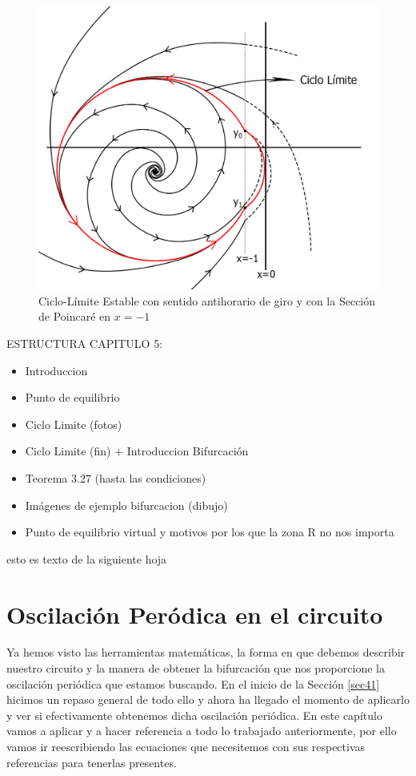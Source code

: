 \documentclass[12pt,a4paper]{report} %
\begin{document}
	\newpage
	
		\begin{figure}[h]
		\centering
		\includegraphics[width=1\textwidth]{ciclolimite3.jpg}
		\caption{Ciclo-Límite Estable con sentido antihorario de giro y con la Sección de Poincaré en $x=-1$}
		\label{fig:ciclolimite3}
	\end{figure}\smallskip
	
	\newpage
	
	ESTRUCTURA CAPITULO 5:
	\begin{itemize}
		\item Introduccion
		\item Punto de equilibrio 
		\item Ciclo Limite (fotos)
		\item Ciclo Limite (fin) + Introduccion Bifurcación
		\item Teorema 3.27 (hasta las condiciones)
		\item Imágenes de ejemplo bifurcacion (dibujo)
		\item Punto de equilibrio virtual y motivos por los que la zona R no nos importa
	\end{itemize}
	
	\newpage
	esto es texto de la siguiente hoja
	
	\chapter{Oscilación Peródica en el circuito}
	
	Ya hemos visto las herramientas matemáticas, la forma en que debemos describir nuestro circuito y la manera de obtener la bifurcación que nos proporcione la oscilación periódica que estamos buscando. En el inicio de la Sección \ref{sec41} hicimos un repaso general de todo ello y ahora ha llegado el momento de aplicarlo y ver si efectivamente obtenemos dicha oscilación periódica. En este capítulo vamos a aplicar y a hacer referencia a todo lo trabajado anteriormente, por ello vamos ir reescribiendo las ecuaciones que necesitemos con sus respectivas referencias para tenerlas presentes.
	
\end{document}
